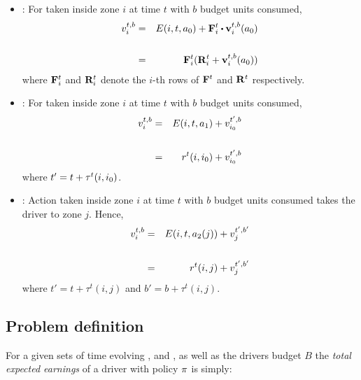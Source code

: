 \begin{itemize}
	\item {\getpassenger} : For {\getpassengeraction} taken inside zone $i$ at time $t$ with $b$ budget units consumed,
	\begin{eqnarray}
	\cumulativeearning{i}{t,b} &=& \actionearning{i}{t}{\getpassengeraction} + \empiricaltransitionmatrix_{i}^{t} \bigcdot \inducedearningvector{i}{t,b}{\getpassengeraction} \\
	\nonumber\\
	&=& \empiricaltransitionmatrix_{i}^{t} (\rewardsmatrix_{i}^{t} + \inducedearningvector{i}{t,b}{\getpassengeraction}) \label{eq:cumulative_earning_get_passenger}
	\end{eqnarray}
	where ${\mathbf{F}}_{i}^{t}$ and ${\mathbf{R}}_{i}^{t}$ denote the $i$-th rows of ${\mathbf{F}}^{t}$ and ${\mathbf{R}}^{t}$ respectively. \\

	\item {\gohome} : For {\gohomeaction} taken inside zone $i$ at time $t$ with $b$ budget units consumed,
	\begin{eqnarray}
	v_{i}^{t,b} &=& E({i},{t},{a_1}) + v_{{i_0}}^{t',b} \\
	\nonumber\\
	&=& r^t(i,{i_0}) + v_{{i_0}}^{t',b} 
	\end{eqnarray}
	where $t' = t + \tau^t(i,{i_0})$. \\

	\item {\relocate} : Action {\relocateaction} taken inside zone $i$ at time $t$ with $b$ budget units consumed takes the driver to zone $j$.
	Hence,
	\begin{eqnarray}
	v_{i}^{t,b} &=& E({i},{t},{a_2(j)}) + v_{j}^{t',b'} \\
	\nonumber \\
	&=& r^t(i,j) + v_{j}^{t',b'}
	\end{eqnarray}
	where $t' = t + \tau^t(i,j)$ and $b' = b + \tau^t(i,j)$. 
\end{itemize}
\fi

\subsection{Problem definition}
For a given sets of time evolving {\empiricaltransitionmatrix}, {\traveltimematrix} and {\rewardsmatrix}, as well as the drivers budget $B$
the \emph{total expected earnings} of a driver  with policy $\pi$ is simply:

